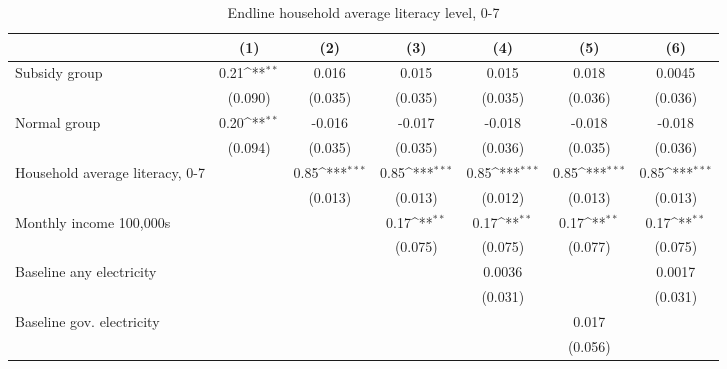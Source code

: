 \begin{table}[htbp]\centering
\def\sym#1{\ifmmode^{#1}\else\(^{#1}\)\fi}
\caption{Endline household average literacy level, 0-7}
\begin{tabular*}{1\hsize}{@{\hskip\tabcolsep\extracolsep\fill}l*{6}{c}}
\toprule
                &\multicolumn{1}{c}{(1)}         &\multicolumn{1}{c}{(2)}         &\multicolumn{1}{c}{(3)}         &\multicolumn{1}{c}{(4)}         &\multicolumn{1}{c}{(5)}         &\multicolumn{1}{c}{(6)}         \\
\midrule
Subsidy group   &     0.21\sym{**} &    0.016         &    0.015         &    0.015         &    0.018         &   0.0045         \\
                &  (0.090)         &  (0.035)         &  (0.035)         &  (0.035)         &  (0.036)         &  (0.036)         \\
Normal group    &     0.20\sym{**} &   -0.016         &   -0.017         &   -0.018         &   -0.018         &   -0.018         \\
                &  (0.094)         &  (0.035)         &  (0.035)         &  (0.036)         &  (0.035)         &  (0.036)         \\
Household average literacy, 0-7&                  &     0.85\sym{***}&     0.85\sym{***}&     0.85\sym{***}&     0.85\sym{***}&     0.85\sym{***}\\
                &                  &  (0.013)         &  (0.013)         &  (0.012)         &  (0.013)         &  (0.013)         \\
Monthly income 100,000s&                  &                  &     0.17\sym{**} &     0.17\sym{**} &     0.17\sym{**} &     0.17\sym{**} \\
                &                  &                  &  (0.075)         &  (0.075)         &  (0.077)         &  (0.075)         \\
Baseline any electricity&                  &                  &                  &   0.0036         &                  &   0.0017         \\
                &                  &                  &                  &  (0.031)         &                  &  (0.031)         \\
Baseline gov. electricity&                  &                  &                  &                  &    0.017         &                  \\
                &                  &                  &                  &                  &  (0.056)         &                  \\

\end{tabular*}
\end{table}
